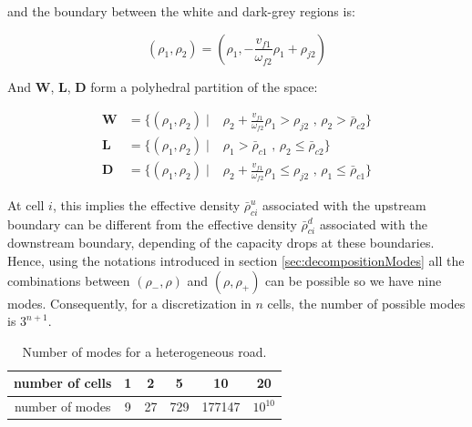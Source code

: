 \noindent and the boundary between the white and dark-grey regions is:

\begin{equation} \label{eq:boundaryHetero}
(\rho_{1},\rho_{2})=(\rho_{1},-\frac{v_{f1}}{\omega_{f2}}\rho_{1}+\rho_{j2})
\end{equation}

\noindent And \textbf{W}, \textbf{L}, \textbf{D} form a polyhedral partition of the space:

\begin{equation}
\begin{array}{lll}
\textbf{W} & = \{(\rho_{1},\rho_{2}) \mid & \rho_{2} + \frac{v_{f1}}{\omega_{f2}}\rho_{1} > \rho_{j2} \text{ ,   } \rho_{2} > \bar{\rho}_{c2}\}\\
\textbf{L} & = \{(\rho_{1},\rho_{2}) \mid & \rho_{1} > \bar{\rho}_{c1} \text{ ,   } \rho_{2} \leq \bar{\rho}_{c2}\}\\
\textbf{D} & = \{(\rho_{1},\rho_{2}) \mid & \rho_{2} + \frac{v_{f1}}{\omega_{f2}}\rho_{1} \leq \rho_{j2} \text{ ,   } \rho_{1} \leq \bar{\rho}_{c1}\}
\end{array}
\label{eq:regions4}
\end{equation}

At cell $i$, this implies the effective density $\bar{\rho}^{u}_{ci}$ associated with the upstream boundary can be different from the effective density $\bar{\rho}^{d}_{ci}$ associated with the downstream boundary, depending of the capacity drops at these boundaries. Hence, using the notations introduced in section \ref{sec:decompositionModes} all the combinations between $(\rho_{-},\rho)$ and $(\rho,\rho_{+})$ can be possible so we have nine modes. Consequently, for a discretization in $n$ cells, the number of possible modes is $3^{n+1}$.

\begin{table}[ht]
\centering %
\begin{tabular}{|c|c|c|c|c|c|}
  \hline
 number of cells & 1 & 2 & 5 & 10 & 20\\
  \hline
 number of modes & 9 & 27 & 729 & 177147 & $10^{10}$\\
  \hline
\end{tabular}
\label{table:numModes2} %
\caption{Number of modes for a heterogeneous road.}
\end{table}

